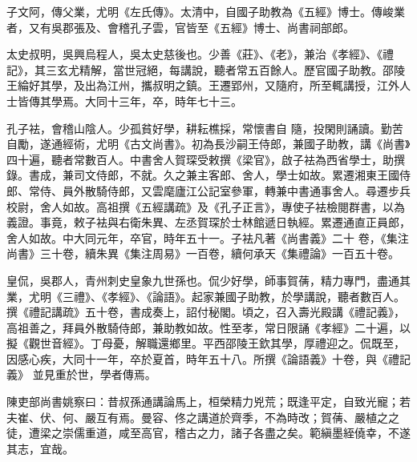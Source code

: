 \begin{pinyinscope}
 子文阿，傳父業，尤明《左氏傳》。太清中，自國子助教為《五經》博士。傳峻業者，又有吳郡張及、會稽孔子雲，官皆至《五經》博士、尚書祠部郎。



 太史叔明，吳興烏程人，吳太史慈後也。少善《莊》、《老》，兼治《孝經》、《禮記》，其三玄尤精解，當世冠絕，每講說，聽者常五百餘人。歷官國子助教。邵陵王綸好其學，及出為江州，攜叔明之鎮。王遷郢州，又隨府，所至輒講授，江外人士皆傳其學焉。大同十三年，卒，時年七十三。



 孔子袪，會稽山陰人。少孤貧好學，耕耘樵採，常懷書自
 隨，投閑則誦讀。勤苦自勵，遂通經術，尤明《古文尚書》。初為長沙嗣王侍郎，兼國子助教，講《尚書》四十遍，聽者常數百人。中書舍人賀琛受敕撰《梁官》，啟子袪為西省學士，助撰錄。書成，兼司文侍郎，不就。久之兼主客郎、舍人，學士如故。累遷湘東王國侍郎、常侍、員外散騎侍郎，又雲麾廬江公記室參軍，轉兼中書通事舍人。尋遷步兵校尉，舍人如故。高祖撰《五經講疏》及《孔子正言》，專使子袪檢閱群書，以為義證。事竟，敕子袪與右衛朱異、左丞賀琛於士林館遞日執經。累遷通直正員郎，舍人如故。中大同元年，卒官，時年五十一。子袪凡著《尚書義》二十
 卷，《集注尚書》三十卷，續朱異《集注周易》一百卷，續何承天《集禮論》一百五十卷。



 皇侃，吳郡人，青州刺史皇象九世孫也。侃少好學，師事賀蒨，精力專門，盡通其業，尤明《三禮》、《孝經》、《論語》。起家兼國子助教，於學講說，聽者數百人。撰《禮記講疏》五十卷，書成奏上，詔付秘閣。頃之，召入壽光殿講《禮記義》，高祖善之，拜員外散騎侍郎，兼助教如故。性至孝，常日限誦《孝經》二十遍，以擬《觀世音經》。丁母憂，解職還鄉里。平西邵陵王欽其學，厚禮迎之。侃既至，因感心疾，大同十一年，卒於夏首，時年五十八。所撰《論語義》十卷，與《禮記義》
 並見重於世，學者傳焉。



 陳吏部尚書姚察曰：昔叔孫通講論馬上，桓榮精力兇荒；既逢平定，自致光寵；若夫崔、伏、何、嚴互有焉。曼容、佟之講道於齊季，不為時改；賀蒨、嚴植之之徒，遭梁之崇儒重道，咸至高官，稽古之力，諸子各盡之矣。範縝墨絰僥幸，不遂其志，宜哉。



\end{pinyinscope}